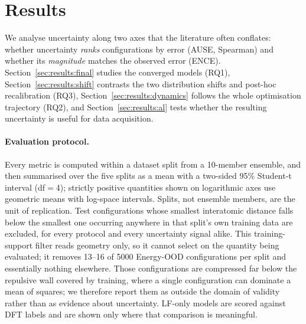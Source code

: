 %
%

\section{Results}
\label{sec:results}

We analyse uncertainty along two axes that the literature often conflates: whether
uncertainty \emph{ranks} configurations by error (AUSE, Spearman) and whether its
\emph{magnitude} matches the observed error (ENCE). Section~\ref{sec:results:final}
studies the converged models (RQ1), Section~\ref{sec:results:shift} contrasts the two
distribution shifts and post-hoc recalibration (RQ3), Section~\ref{sec:results:dynamics}
follows the whole optimisation trajectory (RQ2), and Section~\ref{sec:results:al}
tests whether the resulting uncertainty is useful for data acquisition.

\paragraph{Evaluation protocol.}
Every metric is computed within a dataset split from a 10-member ensemble, and then
summarised over the five splits as a mean with a two-sided 95\% Student-t interval
(df${}={}$4); strictly positive quantities shown on logarithmic axes use geometric
means with log-space intervals. Splits, not ensemble members, are the unit of
replication. Test configurations whose smallest interatomic distance falls below the
smallest one occurring anywhere in that split's own training data are excluded, for
every protocol and every uncertainty signal alike. This training-support filter reads
geometry only, so it cannot select on the quantity being evaluated; it removes 13--16
of 5000 Energy-OOD configurations per split and essentially nothing elsewhere. Those
configurations are compressed far below the repulsive wall covered by training, where
a single configuration can dominate a mean of squares; we therefore report them as
outside the domain of validity rather than as evidence about uncertainty. LF-only
models are scored against DFT labels and are shown only where that comparison is
meaningful.

